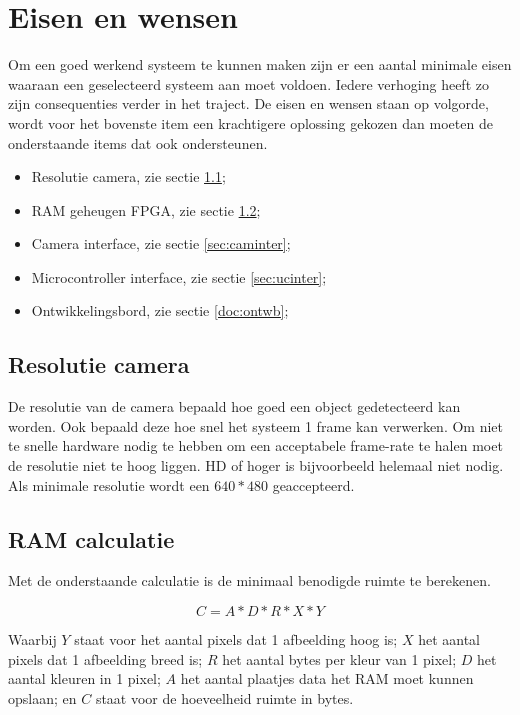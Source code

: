 \chapter{Eisen en wensen}

Om een goed werkend systeem te kunnen maken zijn er een aantal
minimale eisen waaraan een geselecteerd systeem aan moet voldoen.
Iedere verhoging heeft zo zijn consequenties verder in het traject.
De eisen en wensen staan op volgorde, wordt voor het bovenste item
een krachtigere oplossing gekozen dan moeten de onderstaande items
dat ook ondersteunen.

\begin{itemize}
	\item Resolutie camera, zie sectie \ref{sec:cam};
	\item RAM geheugen FPGA, zie sectie \ref{sec:RAM};
	\item Camera interface, zie sectie \ref{sec:caminter};
	\item Microcontroller interface, zie sectie \ref{sec:ucinter};
	\item Ontwikkelingsbord, zie sectie \ref{doc:ontwb};
\end{itemize}

\section{Resolutie camera}
\label{sec:cam}
De resolutie van de camera bepaald hoe goed een object gedetecteerd
kan worden. Ook bepaald deze hoe snel het systeem 1 frame kan verwerken.
Om niet te snelle hardware nodig te hebben om een acceptabele frame-rate
te halen moet de resolutie niet te hoog liggen. HD of hoger is bijvoorbeeld
helemaal niet nodig.
Als minimale resolutie wordt een $640*480$ geaccepteerd.

\section{RAM calculatie}
\label{sec:RAM}	
Met de onderstaande calculatie is de minimaal benodigde ruimte te berekenen.

\begin{equation}
C = A*D*R*X*Y
\end{equation}

Waarbij $Y$ staat voor het aantal pixels dat 1 afbeelding hoog is;
$X$ het aantal pixels dat 1 afbeelding breed is;
$R$ het aantal bytes per kleur van 1 pixel;
$D$ het aantal kleuren in 1 pixel;
$A$ het aantal plaatjes data het RAM moet kunnen opslaan;	
en $C$ staat voor de hoeveelheid ruimte in bytes.

